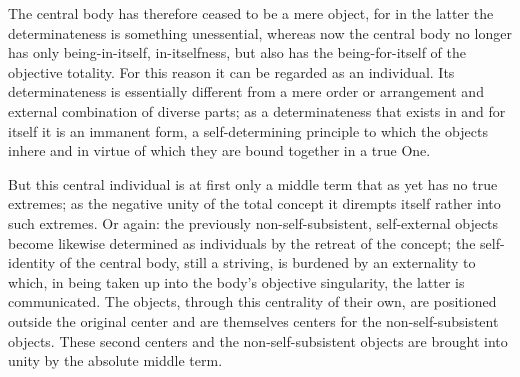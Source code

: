The central body has therefore ceased to be a mere object, for in the latter
the determinateness is something unessential, whereas now the central body
no longer has only being-in-itself, in-itselfness, but also has the being-for-itself
of the objective totality. For this reason it can be regarded as an individual.
Its determinateness is essentially different from a mere order or arrangement
and external combination of diverse parts; as a determinateness that exists
in and for itself it is an immanent form, a self-determining principle to
which the objects inhere and in virtue of which they are bound together
in a true One.

But this central individual is at first only a middle term that as yet has no
true extremes; as the negative unity of the total concept it dirempts itself
rather into such extremes. Or again: the previously non-self-subsistent,
self-external objects become likewise determined as individuals by the
retreat of the concept; the self-identity of the central body, still a striving,
is burdened by an externality to which, in being taken up into the body's
objective singularity, the latter is communicated. The objects, through this
centrality of their own, are positioned outside the original center and are
themselves centers for the non-self-subsistent objects. These second centers
and the non-self-subsistent objects are brought into unity by the absolute
middle term.

